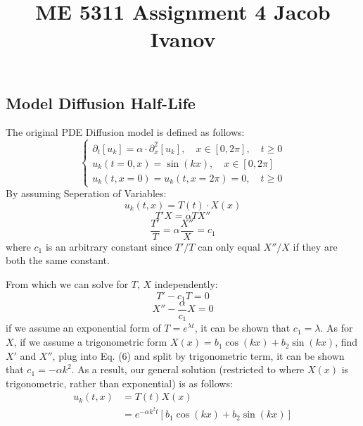 \documentclass[12pt, reqno]{amsart}
\begin{document}
\title{ME 5311 \quad Assignment 4 \quad Jacob Ivanov}

\maketitle
\begin{multicols}{2}
    \section{Model Diffusion Half-Life}
    The original PDE Diffusion model is defined as follows:
    \begin{equation}
        \begin{cases} \partial_t [u_k] = \alpha \cdot \partial_x^2 [u_k], \quad x \in [0, 2 \pi], \quad t \geq 0 \\
        u_k(t=0, x) = \sin(kx), \quad x \in [0, 2 \pi] \\
        u_k(t, x=0) = u_k(t, x = 2 \pi) = 0, \quad t \geq 0 \end{cases}
    \end{equation}
    By assuming Seperation of Variables:
    \begin{equation}
        u_k(t, x) = T(t) \cdot X(x)
    \end{equation}
    \begin{equation}
        T' X = \alpha T X''
    \end{equation}
    \begin{equation}
        \frac{T'}{T} = \alpha \frac{X''}{X} = c_1
    \end{equation}
    where $c_1$ is an arbitrary constant since $T'/T$ can only equal $X''/X$ if they are both the same constant.

    From which we can solve for $T$, $X$ independently:
    \begin{equation}
        T' - c_1 T = 0
    \end{equation}
    \begin{equation} \label{eq:6}
        X'' - \frac{\alpha}{c_1} X = 0
    \end{equation}
    if we assume an exponential form of $T = e^{\lambda t}$, it can be shown that $c_1 = \lambda$. As for $X$, if we assume a trigonometric form $X(x) = b_1 \cos(kx) + b_2 \sin(kx)$, find $X'$ and $X''$, plug into Eq. (6) and split by trigonometric term, it can be shown that $c_1 = - \alpha k^2$. As a result, our general solution (restricted to where $X(x)$ is trigonometric, rather than exponential) is as follows:
    \begin{equation}
        \begin{aligned}
        u_k(t, x) &= T(t) X(x) \\
        &= e^{-\alpha k^2 t} \left[ b_1 \cos(kx) + b_2 \sin(kx) \right]
        \end{aligned}
    \end{equation}


\end{multicols}
\end{document}
